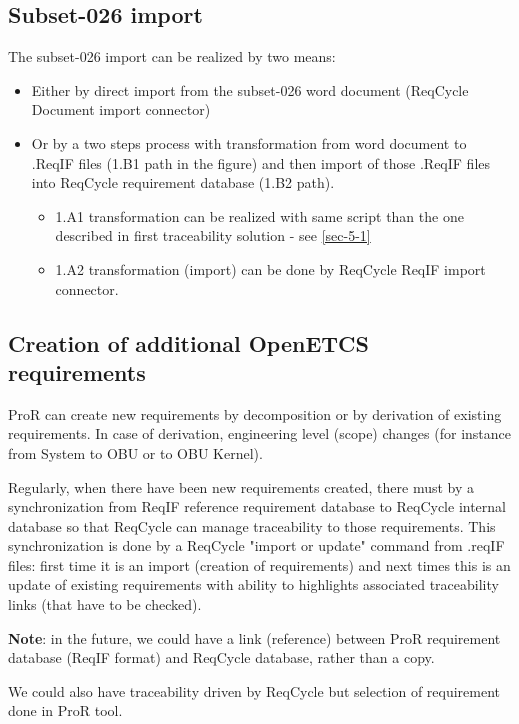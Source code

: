 \documentclass[11pt]{template/openetcs_report}
\begin{document}
\subsection{Subset-026 import}
\label{sec-6-1}
The subset-026 import can be realized by two means:
\begin{itemize}
\item Either by direct import from the subset-026 word document (ReqCycle Document import connector)
\item Or by a two steps process with transformation from word document to .ReqIF files (1.B1 path in the figure) and then import of those .ReqIF files into ReqCycle requirement database (1.B2 path).
	\begin{itemize}

	\item 1.A1 transformation can be realized with same script than the one described in first traceability solution - see \ref{sec-5-1}

	\item 1.A2 transformation (import) can be done by ReqCycle ReqIF import connector.
	\end{itemize}
\end{itemize}

\subsection{Creation of additional OpenETCS requirements}
\label{sec-6-2}
ProR can create new requirements by decomposition or by derivation of existing requirements.
In case of derivation, engineering level (scope) changes (for instance from System to OBU or to OBU Kernel).

Regularly, when there have been new requirements created, there must by a synchronization from ReqIF reference requirement database to ReqCycle internal database so that ReqCycle can manage traceability to those requirements. This synchronization is done by a ReqCycle "import or update" command from .reqIF files: first time it is an import (creation of requirements) and next times this is an update of existing requirements with ability to highlights associated traceability links (that have to be checked).

\textbf{Note}: in the future, we could have a link (reference) between ProR requirement database (ReqIF format) and ReqCycle database, rather than a copy. 

We could also have traceability driven by ReqCycle but selection of requirement done in ProR tool.
\end{document}
